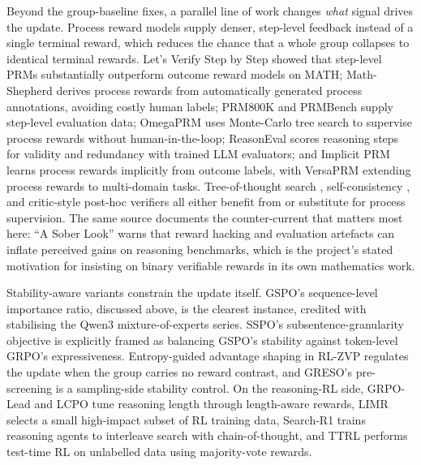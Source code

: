 \documentclass[12pt,a4paper]{report}
\begin{document}
Beyond the group-baseline fixes, a parallel line of work changes
\emph{what} signal drives the update. Process reward models supply
denser, step-level feedback instead of a single terminal reward, which
reduces the chance that a whole group collapses to identical terminal
rewards. Let's Verify Step by Step \citep{lightman2023lets} showed that
step-level PRMs substantially outperform outcome reward models on MATH;
Math-Shepherd \citep{wang2024mathshepherd} derives process rewards from
automatically generated process annotations, avoiding costly human
labels; PRM800K \citep{lightman2023lets} and PRMBench
\citep{song2025prmbench} supply step-level evaluation data; OmegaPRM
\citep{luo2024omegaprm} uses Monte-Carlo tree search to supervise
process rewards without human-in-the-loop; ReasonEval
\citep{xia2025reasoneval} scores reasoning steps for validity and
redundancy with trained LLM evaluators; and Implicit PRM
\citep{yuan2024implicitprm} learns process rewards implicitly from
outcome labels, with VersaPRM \citep{zeng2025versaprm} extending process
rewards to multi-domain tasks. Tree-of-thought search
\citep{yao2023tot}, self-consistency \citep{wang2023selfconsistency},
and critic-style post-hoc verifiers all either benefit from or
substitute for process supervision. The same source documents the
counter-current that matters most here: ``A Sober Look''
\citep{hochlehnert2025sober} warns that reward hacking and evaluation
artefacts can inflate perceived gains on reasoning benchmarks, which is
the project's stated motivation for insisting on binary verifiable
rewards in its own mathematics work.

Stability-aware variants constrain the update itself. GSPO's
sequence-level importance ratio, discussed above, is the clearest
instance, credited with stabilising the Qwen3 mixture-of-experts series.
SSPO's subsentence-granularity objective is explicitly framed as
balancing GSPO's stability against token-level GRPO's expressiveness.
Entropy-guided advantage shaping in RL-ZVP regulates the update when the
group carries no reward contrast, and GRESO's pre-screening is a
sampling-side stability control. On the reasoning-RL side, GRPO-Lead
\citep{zhang2025grpolead} and LCPO \citep{aggarwal2025l1} tune reasoning
length through length-aware rewards, LIMR \citep{li2025limr} selects a
small high-impact subset of RL training data, Search-R1
\citep{jin2025searchr1} trains reasoning agents to interleave search
with chain-of-thought, and TTRL \citep{zuo2025ttrl} performs test-time
RL on unlabelled data using majority-vote rewards.
\end{document}
